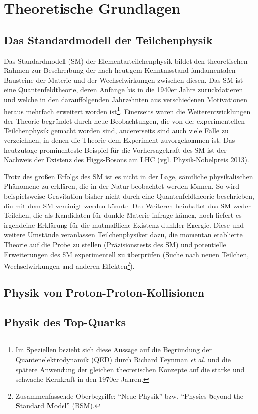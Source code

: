 \chapter{Theoretische Grundlagen}


\section{Das Standardmodell der Teilchenphysik}
\label{sec:sm}

Das Standardmodell (SM) der Elementarteilchenphysik bildet den theoretischen Rahmen zur Beschreibung der nach heutigem Kenntnisstand fundamentalen Bausteine der Materie und der Wechselwirkungen zwischen diesen. Das SM ist eine Quantenfeldtheorie, deren Anfänge bis in die 1940er Jahre zurückdatieren und welche in den darauffolgenden Jahrzehnten aus verschiedenen Motivationen heraus mehrfach erweitert worden ist\footnote{Im Speziellen bezieht sich diese Aussage auf die Begründung der Quantenelektrodynamik (QED) durch Richard Feynman \textit{et al.} und die spätere Anwendung der gleichen theoretischen Konzepte auf die starke und schwache Kernkraft in den 1970er Jahren.}. Einerseits waren die Weiterentwicklungen der Theorie begründet durch neue Beobachtungen, die von der experimentellen Teilchenphysik gemacht worden sind, andererseits sind auch viele Fälle zu verzeichnen, in denen die Theorie dem Experiment zuvorgekommen ist. Das heutzutage prominenteste Beispiel für die Vorhersagekraft des SM ist der Nachweis der Existenz des Higgs-Bosons am LHC (vgl. Physik-Nobelpreis 2013).

Trotz des großen Erfolgs des SM ist es nicht in der Lage, sämtliche physikalischen Phänomene zu erklären, die in der Natur beobachtet werden können. So wird beispielsweise Gravitation bisher nicht durch eine Quantenfeldtheorie beschrieben, die mit dem SM vereinigt werden könnte. Des Weiteren beinhaltet das SM weder Teilchen, die als Kandidaten für dunkle Materie infrage kämen, noch liefert es irgendeine Erklärung für die mutmaßliche Existenz dunkler Energie. Diese und weitere Umstände veranlassen Teilchenphysiker dazu, die momentan etablierte Theorie auf die Probe zu stellen (Präzisionstests des SM) und potentielle Erweiterungen des SM experimentell zu überprüfen (Suche nach neuen Teilchen, Wechselwirkungen und anderen Effekten\footnote{Zusammenfassende Oberbegriffe: "`Neue Physik"' bzw. "`Physics \textbf{b}eyond the \textbf{S}tandard \textbf{M}odel"' (BSM).}).

\section{Physik von Proton-Proton-Kollisionen}
\label{sec:pp}

\section{Physik des Top-Quarks}
\label{sec:top}
